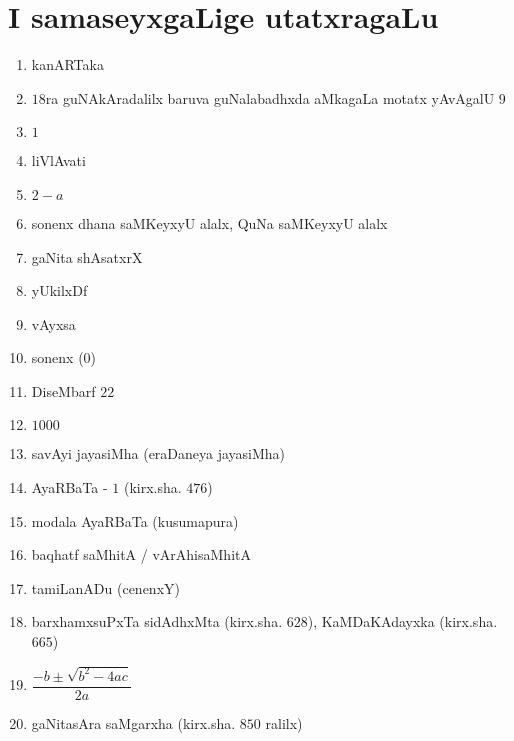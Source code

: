 \chapter{I samaseyxgaLige utatxragaLu}\label{chap24}

\begin{enumerate}
  \renewcommand{\labelenumi}{\rm(\theenumi)}
\item kanARTaka

\item $18$ra guNAkAradalilx baruva guNalabadhxda aMkagaLa motatx yAvAgalU $9$

\item $1$

\item liVlAvati 

\item $2-a$

\item sonenx dhana saMKeyxyU alalx, QuNa saMKeyxyU alalx 

\item gaNita shAsatxrX

\item yUkilxDf

\item vAyxsa

\item sonenx ($0$)

\item DiseMbarf $22$

\item $1000$

\item savAyi jayasiMha (eraDaneya jayasiMha)

\item AyaRBaTa - $1$ (kirx.sha. $476$)

\item modala AyaRBaTa (kusumapura)

\item baqhatf saMhitA / vArAhisaMhitA 

\item tamiLanADu (cenenxY)

\item barxhamxsuPxTa sidAdhxMta (kirx.sha. $628$), KaMDaKAdayxka (kirx.sha. $665$)

\item $\dfrac{-b \pm \sqrt{b^2 - 4ac}}{2a}$

\item gaNitasAra saMgarxha (kirx.sha. $850$ ralilx)


\end{enumerate}
